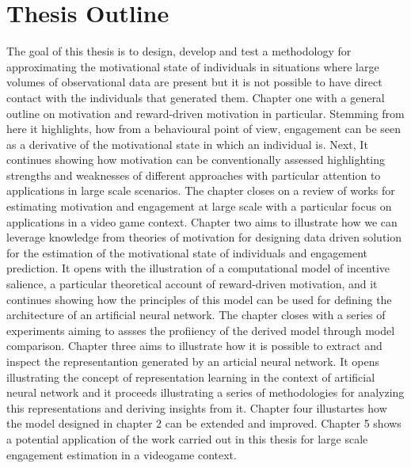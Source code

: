 \section{Thesis Outline}
The goal of this thesis is to design, develop and test a methodology for approximating the motivational state of individuals in situations where large volumes of observational data are present but it is not possible to have direct contact with the individuals that generated them. Chapter one with a general outline on motivation and reward-driven motivation in particular. Stemming from here it highlights, how from a behavioural point of view, engagement can be seen as a derivative of the motivational state in which an individual is. Next, It continues showing how motivation can be conventionally assessed highlighting strengths and weaknesses of different approaches with particular attention to applications in large scale scenarios. The chapter closes on a review of works for estimating motivation and engagement at large scale with a particular focus on applications in a video game context. Chapter two aims to illustrate how we can leverage knowledge from theories of motivation for designing data driven solution for the estimation of the motivational state of individuals and engagement prediction. It opens with the illustration of a computational model of incentive salience, a particular theoretical account of reward-driven motivation, and it continues showing how the principles of this model can be used for defining the architecture of an artificial neural network. The chapter closes with a series of experiments aiming to assses the profiiency of the derived model through model comparison. Chapter three aims to illustrate how it is possible to extract and inspect the representantion generated by an articial neural network. It opens illustrating the concept of representation learning in the context of artificial neural network and it proceeds illustrating a series of methodologies for analyzing this representations and deriving insights from it. Chapter four illustartes how the model designed in chapter 2 can be extended and improved. Chapter 5 shows a potential application of the work carried out in this thesis for large scale engagement estimation in a videogame context.



